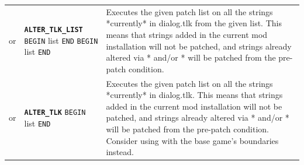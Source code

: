 \documentclass{article}
\def\ttref#1{\ahrefloc{#1}{\tt #1}}
\def\DEFINE#1{{\tt \bf #1}\label{#1}\index{#1}}
\def\t#1{{\tt #1}}
\def\Slist{{\color{red} list }}
\begin{document}
\begin{tabular}{cp{10in}|p{10in}}
or & \DEFINE{ALTER_TLK_LIST} \t{BEGIN} \ttref{value} \Slist \t{END} \t{BEGIN} \ttref{patch} \Slist \t{END} &
		Executes the given patch list on all the strings *currently* in dialog.tlk from the given list.
		This means that strings added in the current mod installation will not
		be patched, and strings already altered via \ttref{ALTER_TLK}* and/or \ttref{STRING_SET}*
		will be patched from the pre-patch condition. \\

	or & \DEFINE{ALTER_TLK} \t{BEGIN} \ttref{patch} \Slist \t{END} &
		Executes the given patch list on all the strings *currently* in dialog.tlk.
		This means that strings added in the current mod installation will not
		be patched, and strings already altered via \ttref{ALTER_TLK}* and/or \ttref{STRING_SET}*
		will be patched from the pre-patch condition. Consider using
		\ttref{ALTER_TLK_RANGE} with the base game's boundaries instead. \\


\end{tabular}
\end{document}

